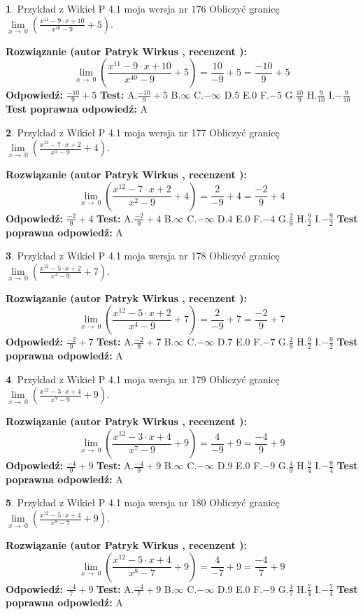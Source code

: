 \documentclass[12pt, a4paper]{article}
\theoremstyle{definition} %
\newtheorem{zad}{}
\newcommand{\zadStart}[1]{\begin{zad}#1\newline}
\newcommand{\zadStop}{\end{zad}}
\newcommand{\rozwStart}[2]{\noindent \textbf{Rozwiązanie (autor #1 , recenzent #2): }\newline}
\newcommand{\rozwStop}{\newline}
\newcommand{\odpStart}{\noindent \textbf{Odpowiedź:}\newline}
\newcommand{\odpStop}{\newline}
\newcommand{\testStart}{\noindent \textbf{Test:}\newline}
\newcommand{\testStop}{\newline}
\newcommand{\kluczStart}{\noindent \textbf{Test poprawna odpowiedź:}\newline}
\newcommand{\kluczStop}{\newline}
\begin{document}
\zadStart{Przykład z Wikieł P 4.1 moja wersja nr 176}
Obliczyć granicę $\lim\limits_{x\to\ 0}(\frac{x^{11}-9 \cdot x +10}{x^{40}-9}+5)$.
\zadStop
\rozwStart{Patryk Wirkus}{}
$$\lim\limits_{x\to\ 0}(\frac{x^{11}-9 \cdot x +10}{x^{40}-9}+5)=\frac{10}{-9}+5=\frac{-10}{9}+5$$
\rozwStop
\odpStart
$\frac{-10}{9}+5$
\odpStop
\testStart
A.$\frac{-10}{9}+5$
B.$\infty$
C.$-\infty$
D.$5$
E.$0$
F.$-5$
G.$\frac{10}{9}$
H.$\frac{9}{10}$
I.$-\frac{9}{10}$
\testStop
\kluczStart
A
\kluczStop



\zadStart{Przykład z Wikieł P 4.1 moja wersja nr 177}
Obliczyć granicę $\lim\limits_{x\to\ 0}(\frac{x^{12}-7 \cdot x +2}{x^{2}-9}+4)$.
\zadStop
\rozwStart{Patryk Wirkus}{}
$$\lim\limits_{x\to\ 0}(\frac{x^{12}-7 \cdot x +2}{x^{2}-9}+4)=\frac{2}{-9}+4=\frac{-2}{9}+4$$
\rozwStop
\odpStart
$\frac{-2}{9}+4$
\odpStop
\testStart
A.$\frac{-2}{9}+4$
B.$\infty$
C.$-\infty$
D.$4$
E.$0$
F.$-4$
G.$\frac{2}{9}$
H.$\frac{9}{2}$
I.$-\frac{9}{2}$
\testStop
\kluczStart
A
\kluczStop



\zadStart{Przykład z Wikieł P 4.1 moja wersja nr 178}
Obliczyć granicę $\lim\limits_{x\to\ 0}(\frac{x^{12}-5 \cdot x +2}{x^{4}-9}+7)$.
\zadStop
\rozwStart{Patryk Wirkus}{}
$$\lim\limits_{x\to\ 0}(\frac{x^{12}-5 \cdot x +2}{x^{4}-9}+7)=\frac{2}{-9}+7=\frac{-2}{9}+7$$
\rozwStop
\odpStart
$\frac{-2}{9}+7$
\odpStop
\testStart
A.$\frac{-2}{9}+7$
B.$\infty$
C.$-\infty$
D.$7$
E.$0$
F.$-7$
G.$\frac{2}{9}$
H.$\frac{9}{2}$
I.$-\frac{9}{2}$
\testStop
\kluczStart
A
\kluczStop



\zadStart{Przykład z Wikieł P 4.1 moja wersja nr 179}
Obliczyć granicę $\lim\limits_{x\to\ 0}(\frac{x^{12}-3 \cdot x +4}{x^{7}-9}+9)$.
\zadStop
\rozwStart{Patryk Wirkus}{}
$$\lim\limits_{x\to\ 0}(\frac{x^{12}-3 \cdot x +4}{x^{7}-9}+9)=\frac{4}{-9}+9=\frac{-4}{9}+9$$
\rozwStop
\odpStart
$\frac{-4}{9}+9$
\odpStop
\testStart
A.$\frac{-4}{9}+9$
B.$\infty$
C.$-\infty$
D.$9$
E.$0$
F.$-9$
G.$\frac{4}{9}$
H.$\frac{9}{4}$
I.$-\frac{9}{4}$
\testStop
\kluczStart
A
\kluczStop



\zadStart{Przykład z Wikieł P 4.1 moja wersja nr 180}
Obliczyć granicę $\lim\limits_{x\to\ 0}(\frac{x^{12}-5 \cdot x +4}{x^{8}-7}+9)$.
\zadStop
\rozwStart{Patryk Wirkus}{}
$$\lim\limits_{x\to\ 0}(\frac{x^{12}-5 \cdot x +4}{x^{8}-7}+9)=\frac{4}{-7}+9=\frac{-4}{7}+9$$
\rozwStop
\odpStart
$\frac{-4}{7}+9$
\odpStop
\testStart
A.$\frac{-4}{7}+9$
B.$\infty$
C.$-\infty$
D.$9$
E.$0$
F.$-9$
G.$\frac{4}{7}$
H.$\frac{7}{4}$
I.$-\frac{7}{4}$
\testStop
\kluczStart
A
\kluczStop
\end{document}
